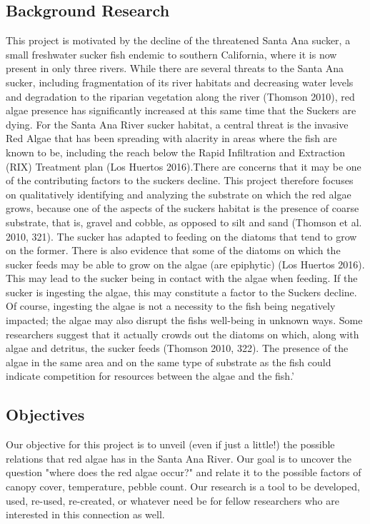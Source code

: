 \documentclass{article}
\begin{document}
\subsection{Background Research} 
This project is motivated by the decline of the threatened Santa Ana sucker, a small freshwater sucker ﬁsh endemic to southern California, where it is now present in only three rivers. While there are several threats to the Santa Ana sucker, including fragmentation of its river habitats and decreasing water levels and degradation to the riparian vegetation along the river (Thomson 2010), red algae presence has significantly increased at this same time that the Suckers are dying. For the Santa Ana River sucker habitat, a central threat is the invasive Red Algae that has been spreading with alacrity in areas where the ﬁsh are known to be, including the reach below the Rapid Inﬁltration and Extraction (RIX) Treatment plan (Los Huertos 2016).There are concerns that it may be one of the contributing factors to the suckers decline. This project therefore focuses on qualitatively identifying and analyzing the substrate on which the red algae grows, because one of the aspects of the suckers habitat is the presence of coarse substrate, that is, gravel and cobble, as opposed to silt and sand (Thomson et al. 2010, 321). The sucker has adapted to feeding on the diatoms that tend to grow on the former. There is also evidence that some of the diatoms on which the sucker feeds may be able to grow on the algae (are epiphytic) (Los Huertos 2016). This may lead to the sucker being in contact with the algae when feeding. If the sucker is ingesting the algae, this may constitute a factor to the Suckers decline. Of course, ingesting the algae is not a necessity to the ﬁsh being negatively impacted; the algae may also disrupt the ﬁshs well-being in unknown ways. Some researchers suggest that it actually crowds out the diatoms on which, along with algae and detritus, the sucker feeds (Thomson 2010, 322). The presence of the algae in the same area and on the same type of substrate as the ﬁsh could indicate competition for resources between the algae and the ﬁsh.'

\subsection{Objectives}
Our objective for this project is to unveil (even if just a little!) the possible relations that red algae has in the Santa Ana River. Our goal is to uncover the question "where does the red algae occur?" and relate it to the possible factors of canopy cover, temperature, pebble count. Our research is a tool to be developed, used, re-used, re-created, or whatever need be for fellow researchers who are interested in this connection as well. 
\end{document}
